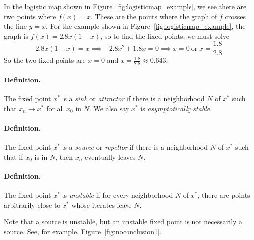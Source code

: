 \documentclass[reqno]{immbook}
\begin{document}
In the logistic map shown in Figure~\ref{fig:logisticmap_example},
we see there are two
points where $f(x)=x$.  These are the points
where the graph of $f$ crosses the line $y=x$.
For the example shown in Figure~\ref{fig:logisticmap_example},
the graph is $f(x) = 2.8x(1-x)$, so to find the fixed points,
we must solve
\begin{equation}
  2.8x(1-x) = x \implies -2.8x^2 + 1.8x = 0
  \implies x = 0 \;\textrm{or}\; x = \frac{1.8}{2.8}
\end{equation}
So the two fixed points are $x=0$ and $x=\frac{1.8}{2.8}\approx 0.643$.

\paragraph{Definition.}
The fixed point $x^*$ is a \emph{sink} or \emph{attractor}
if there is a neighborhood $N$ of $x^*$ such that
$x_n\rightarrow x^*$ for all $x_0$ in $N$.
We also say $x^*$ is \emph{asymptotically stable}.

\paragraph{Definition.}
The fixed point $x^*$ is a \emph{source} or \emph{repellor}
if there is a neighborhood $N$ of $x^*$ such that if $x_0$
is in $N$, then $x_n$ eventually leaves $N$.

\paragraph{Definition.}
The fixed point $x^*$ is \emph{unstable} if for every
neighborhood $N$ of $x^*$, there are points arbitrarily close
to $x^*$ whose iterates leave $N$.

\vspace{0.2cm}
Note that a source is unstable, but an unstable fixed point
is not necessarily a source.  See, for example,
Figure~\ref{fig:noconclusion1}.
\end{document}
